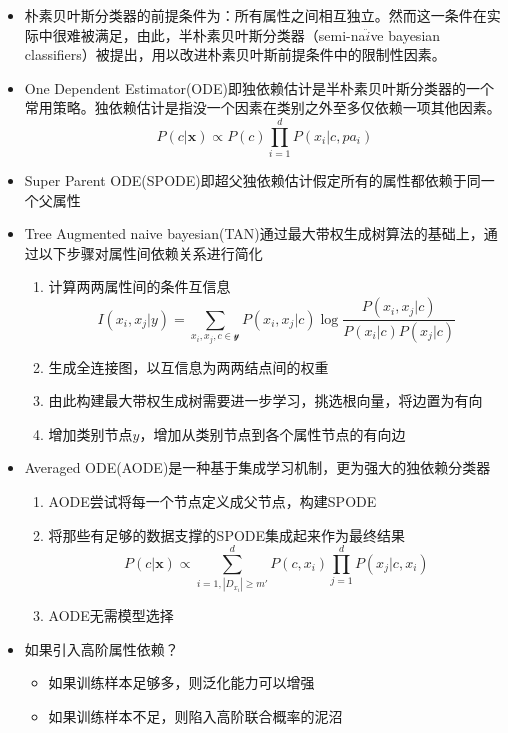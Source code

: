 \begin{itemize}
\item 朴素贝叶斯分类器的前提条件为：所有属性之间相互独立。然而这一条件在实际中很难被满足，由此，半朴素贝叶斯分类器（semi-na$\ddot{i}$ve bayesian classifiers）被提出，用以改进朴素贝叶斯前提条件中的限制性因素。
\item One Dependent Estimator(ODE)即独依赖估计是半朴素贝叶斯分类器的一个常用策略。独依赖估计是指没一个因素在类别之外至多仅依赖一项其他因素。
\begin{equation}
P(c|\mathbf{x})\propto P(c)\prod_{i=1}^dP(x_i|c,pa_i)
\end{equation}
\item Super Parent ODE(SPODE)即超父独依赖估计假定所有的属性都依赖于同一个父属性
\item Tree Augmented naive bayesian(TAN)通过最大带权生成树算法的基础上，通过以下步骤对属性间依赖关系进行简化
    \begin{enumerate}
    \item 计算两两属性间的条件互信息
    \begin{equation}I(x_i,x_j|y)=\sum_{x_i,x_j,c\in\mathcal{y}}P(x_i,x_j|c)\log\frac{P(x_i,x_j|c)}{P(x_i|c)P(x_j|c)}
    \end{equation}
    \item 生成全连接图，以互信息为两两结点间的权重
    \item 由此构建最大带权生成树需要进一步学习，挑选根向量，将边置为有向
    \item 增加类别节点$y$，增加从类别节点到各个属性节点的有向边
\end{enumerate}
\item Averaged ODE(AODE)是一种基于集成学习机制，更为强大的独依赖分类器
    \begin{enumerate}
    \item AODE尝试将每一个节点定义成父节点，构建SPODE
    \item 将那些有足够的数据支撑的SPODE集成起来作为最终结果
    \begin{equation}
    P(c|\mathbf{x})\propto \sum_{i=1, |D_{x_i}|\ge m'}^dP(c,x_i)\prod_{j=1}^dP(x_j|c,x_i)
    \end{equation}
    \item AODE无需模型选择
    \end{enumerate}
\item 如果引入高阶属性依赖？
    \begin{itemize}
    \item 如果训练样本足够多，则泛化能力可以增强
    \item 如果训练样本不足，则陷入高阶联合概率的泥沼
    \end{itemize}
\end{itemize}


